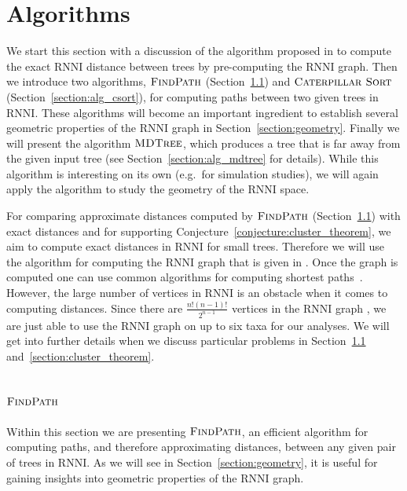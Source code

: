 \documentclass{amsart}
\newcommand{\rnni}{\mathrm{RNNI}}
\newcommand{\csort}{\textsc{Caterpillar Sort}}
\newcommand{\findpath}{\textsc{FindPath}}
\newcommand{\mdtree}{\textsc{MDTree}}
\begin{document}
\section{Algorithms}
\label{section:algorithms}

We start this section with a discussion of the algorithm proposed in \autocite{Gavryushkin2018-ol} to compute the exact $\rnni$ distance between trees by pre-computing the $\rnni$ graph.
Then we introduce two algorithms, $\findpath$ (Section~\ref{section:alg_findpath}) and $\csort$ (Section~\ref{section:alg_csort}), for computing paths between two given trees in $\rnni$.
These algorithms will become an important ingredient to establish several geometric properties of the $\rnni$ graph in Section~\ref{section:geometry}.
Finally we will present the algorithm $\mdtree$, which produces a tree that is far away from the given input tree (see Section~\ref{section:alg_mdtree} for details).
While this algorithm is interesting on its own (e.g.\ for simulation studies), we will again apply the algorithm to study the geometry of the $\rnni$ space.

For comparing approximate distances computed by $\findpath$ (Section~\ref{section:alg_findpath}) with exact distances and for supporting Conjecture~\ref{conjecture:cluster_theorem}, we aim to compute exact distances in $\rnni$ for small trees.
Therefore we will use the algorithm for computing the $\rnni$ graph that is given in \textcite[Section 3.3]{Gavryushkin2018-ol}.
Once the graph is computed one can use common algorithms for computing shortest paths~\autocite{Floyd1962-ew,Dijkstra1959-ph}.
However, the large number of vertices in $\rnni$ is an obstacle when it comes to computing distances.
Since there are $\frac{n!(n-1)!}{2^{n-1}}$ vertices in the $\rnni$ graph \autocite{Gavryushkin2018-ol}, we are just able to use the $\rnni$ graph on up to six taxa for our analyses.
We will get into further details when we discuss particular problems in Section~\ref{section:alg_findpath} and~\ref{section:cluster_theorem}.


\subsection{$\findpath$}
\label{section:alg_findpath}

Within this section we are presenting $\findpath$, an efficient algorithm for computing paths, and therefore approximating distances, between any given pair of trees in $\rnni$.
As we will see in Section~\ref{section:geometry}, it is useful for gaining insights into geometric properties of the $\rnni$ graph.
\end{document}
